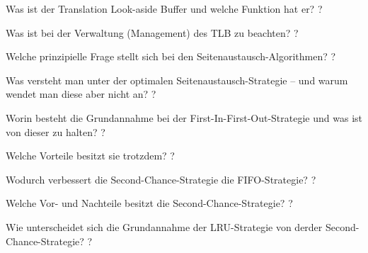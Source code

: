 \documentclass[avery5371]{flashcards}
\begin{document}
\begin{flashcard}[Speichermanagement]{Was ist der Translation Look-aside Buffer und welche Funktion hat er? }
    ?
\end{flashcard}

\begin{flashcard}[Speichermanagement]{Was ist bei der Verwaltung (Management) des TLB zu beachten? }
    ?
\end{flashcard}

\begin{flashcard}[Speichermanagement]{Welche prinzipielle Frage stellt sich bei den Seitenaustausch-Algorithmen?}
    ?
\end{flashcard}

\begin{flashcard}[Speichermanagement]{Was versteht man unter der optimalen Seitenaustausch-Strategie – und warum wendet man diese aber nicht an?}
    ?
\end{flashcard}

\begin{flashcard}[Speichermanagement]{Worin besteht die Grundannahme bei der First-In-First-Out-Strategie und was ist von dieser zu halten? }
    ?
\end{flashcard}

\begin{flashcard}[Speichermanagement]{Welche Vorteile besitzt sie trotzdem? }
    ?
\end{flashcard}

\begin{flashcard}[Speichermanagement]{Wodurch verbessert die Second-Chance-Strategie die FIFO-Strategie?}
    ?
\end{flashcard}

\begin{flashcard}[Speichermanagement]{Welche Vor- und Nachteile besitzt die Second-Chance-Strategie? }
    ?
\end{flashcard}

\begin{flashcard}[Speichermanagement]{Wie unterscheidet sich die Grundannahme der LRU-Strategie von derder Second-Chance-Strategie?}
    ?
\end{flashcard}
\end{document}
